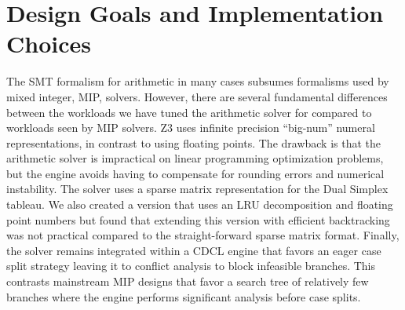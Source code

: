 \section{Design Goals and Implementation Choices}

The SMT formalism for arithmetic in many cases subsumes formalisms used by mixed integer, MIP, solvers.
However, there are several fundamental differences between the workloads we have tuned the arithmetic
solver for compared to workloads seen by MIP solvers.
Z3 uses infinite precision ``big-num'' numeral representations, in contrast to using floating points.
The drawback is that the arithmetic solver is impractical on linear programming optimization problems,
but the engine avoids having to compensate for rounding errors and numerical instability.
The solver uses a sparse matrix representation
for the Dual Simplex tableau.
We also created a version that uses an LRU decomposition and floating
point numbers but found that extending this version with efficient backtracking was not practical
compared to the straight-forward sparse matrix format.
Finally, the solver remains integrated within a CDCL engine that favors an eager case split strategy
leaving it to conflict analysis to block infeasible branches. This contrasts mainstream MIP designs
that favor a search tree of relatively few branches where the engine performs significant analysis before case splits.


